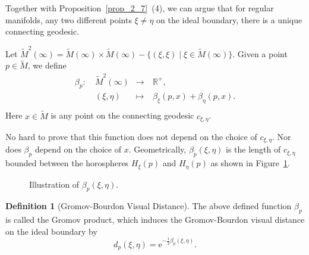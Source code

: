 \documentclass[reqno,11pt]{article}
\theoremstyle{definition}
\newtheorem{definition}[theorem]{Definition}
\theoremstyle{remark}
\numberwithin{equation}{section}
\begin{document}
Together with Proposition~\ref{prop_2_7}~(4), we can argue that for regular manifolds, any two different points $\xi\neq\eta$ on the ideal boundary, there is a unique connecting geodesic.


Let $\widetilde{M}^2(\infty)=\widetilde{M}(\infty)\times\widetilde{M}(\infty)-\{(\xi,\xi)\mid \xi\in\widetilde{M}(\infty)\}$. Given a point $p\in\widetilde{M}$, we define
\begin{displaymath}
	\begin{aligned}
		\beta_p:~& \widetilde{M}^2(\infty) & \to     &~\mathbb{R}^{+},                     \\
		          & (\xi,\eta)              & \mapsto &~\beta_{\xi}(p,x)+\beta_{\eta}(p,x). \\
	\end{aligned}
\end{displaymath}
Here $x\in\widetilde{M}$ is any point on the connecting geodesic $c_{\xi,\eta}$.

No hard to prove that this function does not depend on the choice of $c_{\xi,\eta}$. Nor does $\beta_p$ depend on the choice of $x$. Geometrically, $\beta_p(\xi,\eta)$ is the length of $c_{\xi,\eta}$ bounded between the horospheres $H_{\xi}(p)$ and $H_{\eta}(p)$ as shown in Figure~\ref{fig1}.

\begin{figure}[htbp]
\centering
	\caption{Illustration of $\beta_p(\xi,\eta)$.}\label{fig1}
\end{figure}

\begin{definition}[Gromov-Bourdon Visual Distance]
	The above defined function $\beta_p$ is called the Gromov product, which induces the Gromov-Bourdon visual distance on the ideal boundary by
	\begin{displaymath}
		d_p(\xi,\eta)=\mathrm{e}^{-\frac 12\beta_p(\xi,\eta)}.
	\end{displaymath}
\end{definition}
\end{document}
